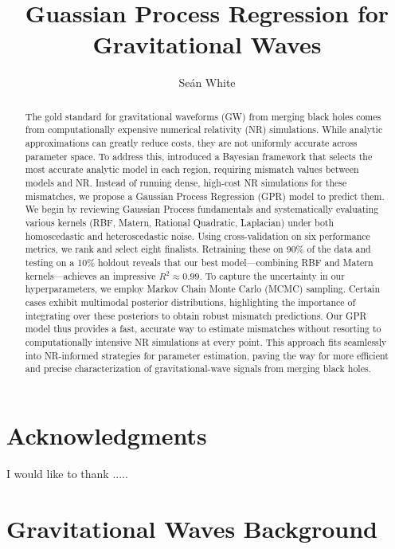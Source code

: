 \documentclass{ucdgradtaughtthesis}
\title{Guassian Process Regression for Gravitational Waves}
\author{Seán White}
\begin{document}
\pagestyle{plain}


\maketitle

\begin{abstract}The gold standard for gravitational waveforms (GW) from merging black holes comes from computationally expensive numerical relativity (NR) simulations. While analytic approximations can greatly reduce costs,
 they are not uniformly accurate across parameter space. To address this,\cite{Ogpaper} introduced a Bayesian framework that selects the most accurate analytic model in each region, requiring mismatch values between models and NR. Instead of running dense,
  high-cost NR simulations for these mismatches, we propose a Gaussian Process Regression (GPR) model to predict them.
We begin by reviewing Gaussian Process fundamentals and systematically evaluating various kernels (RBF, Matern, Rational Quadratic, Laplacian) under both homoscedastic and heteroscedastic noise.
 Using cross-validation on six performance metrics, we rank and select eight finalists. Retraining these on 90\% of the data and testing on a 10\% holdout reveals that our best model—combining RBF
  and Matern kernels—achieves an impressive \(R^2 \approx 0.99\).
To capture the uncertainty in our hyperparameters, we employ Markov Chain Monte Carlo (MCMC) sampling. 
Certain cases exhibit multimodal posterior distributions, highlighting the importance of integrating over these posteriors to obtain robust mismatch predictions.
Our GPR model thus provides a fast, accurate way to estimate mismatches without resorting to computationally intensive NR simulations at every point.
 This approach fits seamlessly into NR-informed strategies for parameter estimation, paving the way for more efficient and precise characterization of gravitational-wave signals from merging black holes.
\end{abstract}

\chapter*{Acknowledgments}
I would like to thank .....

\tableofcontents
\listoffigures
\listoftables

\clearpage
{}
\pagestyle{fancy}


\chapter{Gravitational Waves Background}
\end{document}
